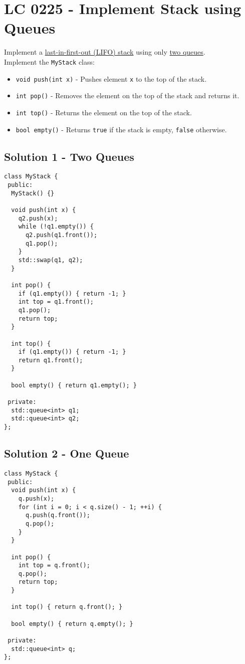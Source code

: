 \section{LC 0225 - Implement Stack using Queues}
Implement a \ul{last-in-first-out (LIFO) stack} using only \ul{two queues}.\\

Implement the {\colorbox{CodeBackground}{\lstinline|MyStack|}} class:
\begin{itemize}
\item {\colorbox{CodeBackground}{\lstinline|void push(int x)|}} - Pushes element {\colorbox{CodeBackground}{\lstinline|x|}} to the top of the stack.
\item {\colorbox{CodeBackground}{\lstinline|int pop()|}} - Removes the element on the top of the stack and returns it.
\item {\colorbox{CodeBackground}{\lstinline|int top()|}} - Returns the element on the top of the stack.
\item {\colorbox{CodeBackground}{\lstinline|bool empty()|}} - Returns {\colorbox{CodeBackground}{\lstinline|true|}} if the stack is empty, {\colorbox{CodeBackground}{\lstinline|false|}} otherwise.
\end{itemize}

\subsection*{Solution 1 - Two Queues}
\begin{lstlisting}
class MyStack {
 public:
  MyStack() {}

  void push(int x) {
    q2.push(x);
    while (!q1.empty()) {
      q2.push(q1.front());
      q1.pop();
    }
    std::swap(q1, q2);
  }

  int pop() {
    if (q1.empty()) { return -1; }
    int top = q1.front();
    q1.pop();
    return top;
  }

  int top() {
    if (q1.empty()) { return -1; }
    return q1.front();
  }

  bool empty() { return q1.empty(); }

 private:
  std::queue<int> q1;
  std::queue<int> q2;
};
\end{lstlisting}

\subsection*{Solution 2 - One Queue}
\begin{lstlisting}
class MyStack {
 public:
  void push(int x) {
    q.push(x);
    for (int i = 0; i < q.size() - 1; ++i) {
      q.push(q.front());
      q.pop();
    }
  }

  int pop() {
    int top = q.front();
    q.pop();
    return top;
  }

  int top() { return q.front(); }

  bool empty() { return q.empty(); }

 private:
  std::queue<int> q;
};
\end{lstlisting}

